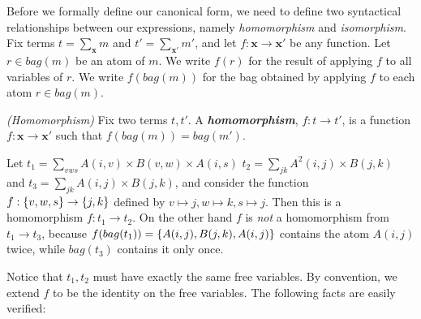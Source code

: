Before we formally define our canonical form, we need to define two syntactical relationships between our expressions, namely {\em homomorphism} and {\em isomorphism}. Fix terms $t = \sum_{\pmb{x}} m$ and $t' = \sum_{\pmb{x'}} m'$, and let $f: \pmb{x} \rightarrow \pmb{x}'$ be any function. Let $r \in bag(m)$ be an atom of $m$. We write $f(r)$ for the result of applying $f$ to all variables of $r$. We write $f(bag(m))$ for the bag obtained by applying $f$ to each atom $r \in bag(m)$. 
\begin{defn}{\em (Homomorphism)}
  Fix two terms $t, t'$.  A \emph{\textbf{homomorphism}}, $f : t \rightarrow t'$, is a function $f: \pmb{x} \rightarrow \pmb{x}'$ such that $f(bag(m))=bag(m')$.
\end{defn}{}
\begin{ex}
  Let $t_1 = \sum_{vws} A(i,v) \times B(v,w) \times A(i,s)$ $t_2= \sum_{jk} A^2(i,j) \times B(j,k)$ and $t_3 = \sum_{jk} A(i,j) \times B(j,k)$, and consider the function $f: \{v,w,s\} \rightarrow \{j,k\}$ defined by $v \mapsto j, w \mapsto k, s \mapsto j$.  Then this is a homomorphism $f : t_1 \rightarrow t_2$.  On the other hand $f$ is {\em not} a homomorphism from $t_1 \rightarrow t_3$, because $f(bag(t_1)) = \{A(i,j), B(j,k), A(i,j)\}$ contains the atom $A(i,j)$ twice, while $bag(t_3)$ contains it only once.
\end{ex}
Notice that $t_1, t_2$ must have exactly the same free variables.  By convention, we extend $f$ to be the identity on the free variables.  The following facts are easily verified:
